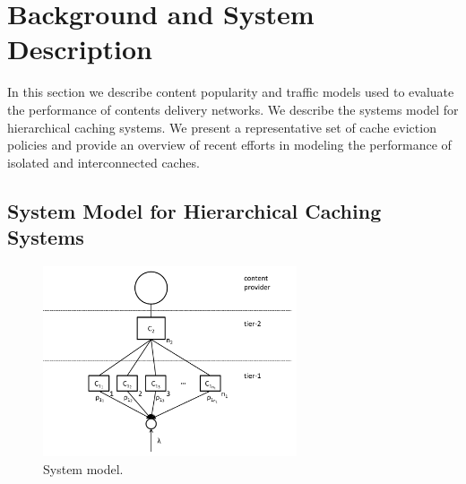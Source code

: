 \section{Background and System Description}\label{sec:hierarchical:related_work}

In this section we describe content popularity and traffic models used to evaluate the performance of contents delivery networks.
We describe the systems model for hierarchical caching systems.
We present a representative set of cache eviction policies and provide an overview of recent efforts in modeling the performance of isolated and interconnected caches.

\subsection{System Model for Hierarchical Caching Systems}\label{sec:hierarchical:system_model}

\begin{figure}[tb]
\centering
\includegraphics[width=75mm]{hierarchical/analyticbw/figures/hcmodeln1}
\caption{System model.}
\label{fig:hcmodel}
\end{figure}

